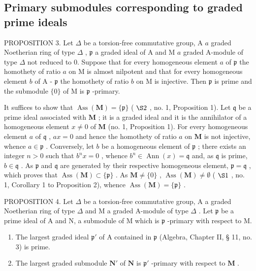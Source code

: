 \subsection{Primary submodules corresponding to graded prime ideals}

PROPOSITION 3. Let \(\Delta\) be a torsion-free commutative group, A \(a\) graded Noetherian ring of type \(\Delta\) , \(\mathfrak{p}\) a graded ideal of A and M \(a\) graded A-module of type \(\Delta\) not reduced to 0. Suppose that for every homogeneous element \(a\) of \(\mathfrak{p}\) the homothety of ratio \(a\) on M is almost nilpotent and that for every homogeneous element \(b\) of A - \(\mathfrak{p}\) the homothety of ratio \(b\) on M is injective. Then \(\mathfrak{p}\) is prime and the submodule \(\{0\}\) of M is \(\mathfrak{p}\) -primary.

It suffices to show that \(\operatorname{Ass}(\mathbf{M}) = \{\mathfrak{p}\}\) ( \(\S 2\) , no. 1, Proposition 1). Let \(\mathfrak{q}\) be a prime ideal associated with \(\mathbf{M}\) ; it is a graded ideal and it is the annihilator of a homogeneous element \(x \neq 0\) of \(\mathbf{M}\) (no. 1, Proposition 1). For every homogeneous element \(a\) of \(\mathfrak{q}\) , \(ax = 0\) and hence the homothety of ratio \(a\) on \(\mathbf{M}\) is not injective, whence \(a \in \mathfrak{p}\) . Conversely, let \(b\) be a homogeneous element of \(\mathfrak{p}\) ; there exists an integer \(n > 0\) such that \(b^n x = 0\) , whence \(b^n \in \operatorname{Ann}(x) = \mathfrak{q}\) and, as \(\mathfrak{q}\) is prime, \(b \in \mathfrak{q}\) . As \(\mathfrak{p}\) and \(\mathfrak{q}\) are generated by their respective homogeneous element, \(\mathfrak{p} = \mathfrak{q}\) , which proves that \(\operatorname{Ass}(\mathbf{M}) \subset \{\mathfrak{p}\}\) . As \(\mathbf{M} \neq \{0\}\) , \(\operatorname{Ass}(\mathbf{M}) \neq \emptyset\) ( \(\S 1\) , no. 1, Corollary 1 to Proposition 2), whence \(\operatorname{Ass}(\mathbf{M}) = \{\mathfrak{p}\}\) .

PROPOSITION 4. Let \(\Delta\) be a torsion-free commutative group, A a graded Noetherian ring of type \(\Delta\) and M a graded A-module of type \(\Delta\) . Let \(\mathfrak{p}\) be a prime ideal of A and N, a submodule of M which is \(\mathfrak{p}\) -primary with respect to M.

\begin{enumerate}
\def\labelenumi{(\roman{enumi})}
\item
  The largest graded ideal \(\mathfrak{p}'\) of A contained in \(\mathfrak{p}\) (Algebra, Chapter II, § 11, no. 3) is prime.
\item
  The largest graded submodule \(\mathbf{N}'\) of \(\mathbf{N}\) is \(\mathfrak{p}'\) -primary with respect to \(\mathbf{M}\) .
\end{enumerate}

